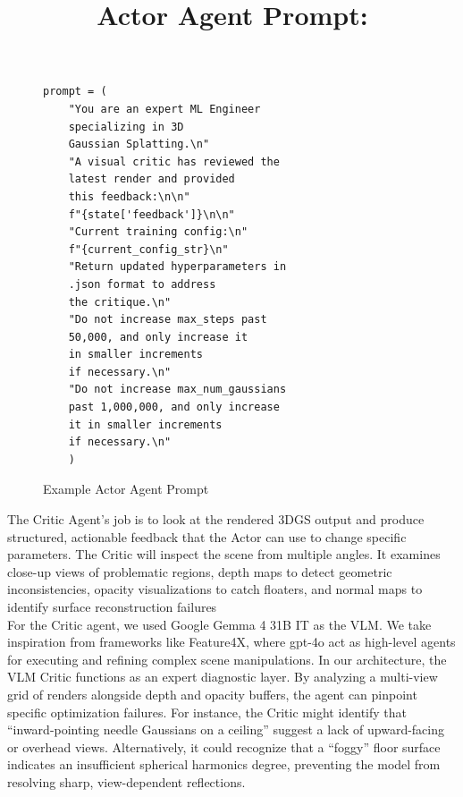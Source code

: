 \newpage
\noindent\title{Actor Agent Prompt:}
\begin{figure}[h]
\centering
\begin{verbatim}
prompt = (
    "You are an expert ML Engineer 
    specializing in 3D 
    Gaussian Splatting.\n"
    "A visual critic has reviewed the 
    latest render and provided 
    this feedback:\n\n"
    f"{state['feedback']}\n\n"
    "Current training config:\n"
    f"{current_config_str}\n"
    "Return updated hyperparameters in 
    .json format to address 
    the critique.\n"
    "Do not increase max_steps past 
    50,000, and only increase it 
    in smaller increments 
    if necessary.\n"
    "Do not increase max_num_gaussians
    past 1,000,000, and only increase 
    it in smaller increments 
    if necessary.\n"
    )
\end{verbatim}
\caption{Example Actor Agent Prompt}
\label{fig:actor-agent-prompt}
\end{figure}

\noindent The Critic Agent's job is to look at the rendered 3DGS output and produce structured, actionable feedback that the Actor can use to change specific parameters. The Critic will inspect the scene from multiple angles. It examines close-up views of problematic regions, depth maps to detect geometric inconsistencies, opacity visualizations to catch floaters, and normal maps to identify surface reconstruction failures\\

\noindent For the Critic agent, we used Google Gemma 4 31B IT as the VLM. We take inspiration from frameworks like Feature4X, where gpt-4o act as high-level agents for executing and refining complex scene manipulations. In our architecture, the VLM Critic functions as an expert diagnostic layer. By analyzing a multi-view grid of renders alongside depth and opacity buffers, the agent can pinpoint specific optimization failures. For instance, the Critic might identify that “inward-pointing needle Gaussians on a ceiling” suggest a lack of upward-facing or overhead views. Alternatively, it could recognize that a “foggy” floor surface indicates an insufficient spherical harmonics degree, preventing the model from resolving sharp, view-dependent reflections.\\


